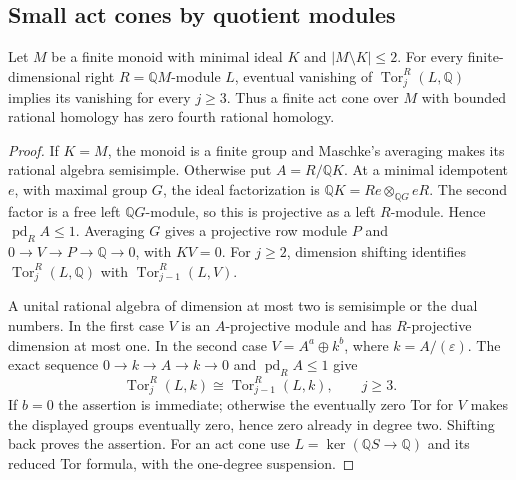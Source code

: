 \subsection{Small act cones by quotient modules}

\begin{lemma}
\label{CP2:A-two-outside-acts}
Let $M$ be a finite monoid with minimal ideal $K$ and
$|M\setminus K|\leq2$. For every finite-dimensional right
$R=\mathbb QM$-module $L$, eventual vanishing of
$\operatorname{Tor}^R_j(L,\mathbb Q)$ implies its vanishing
for every $j\geq3$. Thus a finite act cone over $M$ with
bounded rational homology has zero fourth rational homology.
\end{lemma}
\begin{proof}
If $K=M$, the monoid is a finite group and Maschke's
averaging makes its rational algebra semisimple. Otherwise
put $A=R/\mathbb QK$. At a minimal idempotent $e$, with
maximal group $G$, the ideal factorization is
$\mathbb QK=Re\otimes_{\mathbb QG}eR$.
The second factor is a free left $\mathbb QG$-module,
so this is projective as a left $R$-module. Hence
$\operatorname{pd}_R A\leq1$.
Averaging $G$ gives a projective row module $P$ and
$0\to V\to P\to\mathbb Q\to0$, with $KV=0$.
For $j\geq2$, dimension shifting identifies
$\operatorname{Tor}_j^R(L,\mathbb Q)$ with
$\operatorname{Tor}_{j-1}^R(L,V)$.

A unital rational algebra of dimension at most two is
semisimple or the dual numbers. In the first case $V$
is an $A$-projective module and has $R$-projective
dimension at most one. In the second case
$V=A^a\oplus k^b$, where $k=A/(\varepsilon)$.
The exact sequence $0\to k\to A\to k\to0$ and
$\operatorname{pd}_R A\leq1$ give
\[
 \operatorname{Tor}_j^R(L,k)
   \cong\operatorname{Tor}_{j-1}^R(L,k),\qquad j\geq3.
\]
If $b=0$ the assertion is immediate; otherwise the
eventually zero Tor for $V$ makes the displayed groups
eventually zero, hence zero already in degree two.
Shifting back proves the assertion. For an act cone
use $L=\ker(\mathbb QS\to\mathbb Q)$ and its reduced
Tor formula, with the one-degree suspension.
\end{proof}

